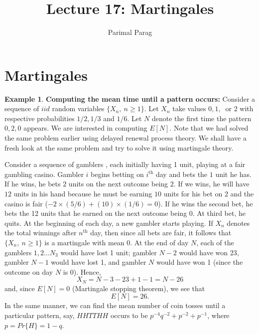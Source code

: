 \documentclass[a4paper,10pt]{article}
\date{}
\title{Lecture 17: Martingales}
\author{Parimal Parag}
\theoremstyle{plain}
\theoremstyle{definition}
\newtheorem{exmp}[thm]{Example}
\theoremstyle{remark}
\begin{document}
\maketitle
\section{Martingales}

\begin{exmp}
\textbf{Computing the mean time until a pattern occurs:} Consider a sequence of $\textit{iid}$ random variables $\{X_n,~ n\geq 1\}$. Let $X_n$ take values $0,1,~$ or $2$ with respective probabilities  $1/2,1/3$ and $1/6$. Let $N$ denote the first time the pattern $0,2,0$ appears. We are interested in computing $E[N]$. Note that we had solved the same problem earlier using delayed renewal process theory. We shall have a fresh look at the same problem and try to solve it using martingale theory. 

Consider a sequence of gamblers , each initially having 1 unit, playing at a fair gambling casino. Gambler $i$ begins betting on $i^{\text{th}}$ day and bets the $1$ unit he has. If he wins, he bets $2$ units on the next outcome being $2$. If we wins, he will have $12$ units in his hand because he must be earning $10$ units for his bet on $2$ and the casino is fair ($-2 \times (5/6) + (10) \times( 1/6) = 0$). If he wins the second bet, he bets the 12 units that he earned on the next outcome being $0$. At third bet, he quits. At the beginning of each day, a new gambler starts playing. If $X_n$ denotes the total winnings after $n^\text{th}$ day, then since all bets are fair, it follows that $\{X_n,~n \geq 1\}$ is a martingale with mean 0. At the end of day $N$, each of the gamblers $1,2 \hdots N_3$ would have lost 1 unit; gambler $N-2$ would have won 23, gambler $N-1$ would have lost 1, and gambler $N$ would have won 1 (since the outcome on day $N$ is 0). Hence,
\begin{equation*}
X_N=N-3-23+1-1=N-26
\end{equation*}
  and, since $E[N]=0$ (Martingale stopping theorem), we see that
  \begin{equation*}
     E[N]=26.
  \end{equation*}
  In the same manner, we can find the mean number of coin tosses until a particular pattern, say, $HHTTHH$ occurs to be $p^{-4}q^{-2}+p^{-2}+p^{-1}$, where $p=Pr\{H\}=1-q$.
\end{exmp}
\end{document}

